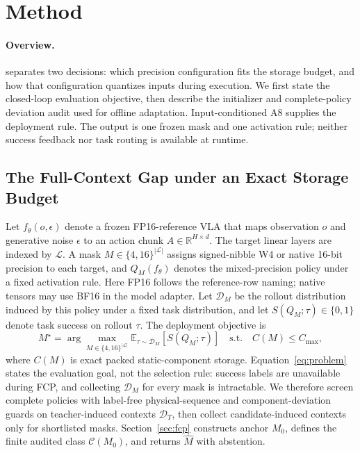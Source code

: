 \section{Method}
\label{sec:method}

\paragraph{Overview.}
\method separates two decisions: which precision configuration fits the storage budget, and how that configuration quantizes inputs during execution. We first state the closed-loop evaluation objective, then describe the initializer and complete-policy deviation audit used for offline adaptation. Input-conditioned A8 supplies the deployment rule. The output is one frozen mask and one activation rule; neither success feedback nor task routing is available at runtime.

\subsection{The Full-Context Gap under an Exact Storage Budget}
\label{sec:problem}

Let $f_{\theta}(o,\epsilon)$ denote a frozen FP16-reference VLA that maps observation $o$ and generative noise $\epsilon$ to an action chunk $A\in\mathbb{R}^{H\times d}$. The target linear layers are indexed by $\mathcal{L}$. A mask $M\in\{4,16\}^{|\mathcal{L}|}$ assigns signed-nibble W4 or native 16-bit precision to each target, and $Q_M(f_\theta)$ denotes the mixed-precision policy under a fixed activation rule. Here FP16 follows the reference-row naming; native tensors may use BF16 in the model adapter. Let $\mathcal D_M$ be the rollout distribution induced by this policy under a fixed task distribution, and let $S(Q_M;\tau)\in\{0,1\}$ denote task success on rollout $\tau$. The deployment objective is
\begin{equation}
 M^\star=\arg\max_{M\in\{4,16\}^{|\mathcal L|}}
 \mathbb E_{\tau\sim\mathcal D_M}\!\left[S(Q_M;\tau)\right]
 \quad\text{s.t.}\quad C(M)\le C_{\max},
 \label{eq:problem}
\end{equation}
where $C(M)$ is exact packed static-component storage. Equation~\ref{eq:problem} states the evaluation goal, not the selection rule: success labels are unavailable during FCP, and collecting $\mathcal D_M$ for every mask is intractable. We therefore screen complete policies with label-free physical-sequence and component-deviation guards on teacher-induced contexts $\mathcal D_T$, then collect candidate-induced contexts only for shortlisted masks. Section~\ref{sec:fcp} constructs anchor $M_0$, defines the finite audited class $\mathcal C(M_0)$, and returns $\widehat M$ with abstention.

